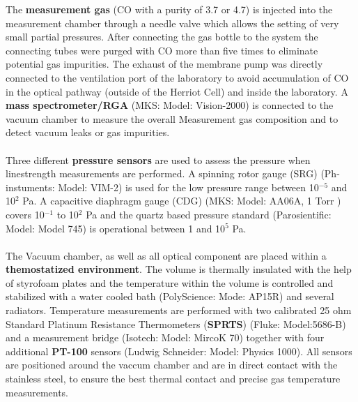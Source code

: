 \noindent
The \textbf{measurement gas} (CO with a purity of 3.7 or 4.7) is injected into the measurement chamber through a needle valve which allows the setting of very small partial pressures. After connecting the gas bottle to the system the connecting tubes were purged with CO more than five times to eliminate potential gas impurities. The exhaust of the membrane pump was directly connected to the ventilation port of the laboratory to avoid accumulation of CO in the optical pathway (outside of the Herriot Cell) and inside the laboratory. A \textbf{mass spectrometer/RGA} (MKS: Model: Vision-2000) is connected to the vacuum chamber to measure the overall Measurement gas composition and to detect vacuum leaks or gas impurities.\\\\
\noindent
Three different \textbf{pressure sensors} are used to assess the pressure when linestrength measurements are performed. A spinning rotor gauge (SRG) (Ph-instuments: Model: VIM-2) is used for the low pressure range between  10$^{-5}$ and 10$^2$ Pa. A capacitive diaphragm gauge (CDG) (MKS: Model:	AA06A, 1 Torr )  covers 10$^{-1}$ to 10$^2$ Pa and the quartz based pressure standard (Parosientific: Model: Model 745) is operational between 1 and 10$^5$ Pa.\\\\
\noindent
The Vacuum chamber, as well as all optical component are placed within a \textbf{themostatized environment}. The volume is thermally insulated with the help of styrofoam plates and the temperature within the volume is controlled and stabilized with a water cooled bath (PolyScience: Mode: AP15R) and several radiators. Temperature measurements are performed with two calibrated 25 ohm Standard Platinum Resistance Thermometers (\textbf{SPRTS}) (Fluke: Model:5686-B) and a measurement bridge (Isotech: Model: MircoK 70) together with four additional \textbf{PT-100} sensors (Ludwig Schneider: Model: Physics 1000). All sensors are positioned around the vaccum chamber and are in direct contact with the stainless steel, to ensure the best thermal contact and precise gas temperature measurements.\\\\
\noindent

